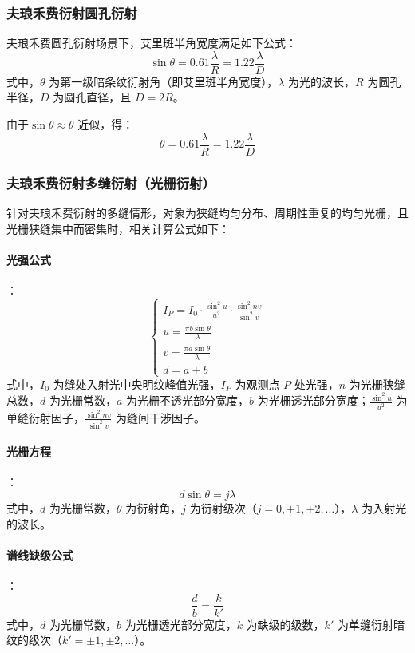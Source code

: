 \documentclass{article}
\begin{document}
	
	\subsubsection{夫琅禾费衍射圆孔衍射}夫琅禾费圆孔衍射场景下，艾里斑半角宽度满足如下公式：
	\[
	\sin\theta = 0.61\frac{\lambda}{R} = 1.22\frac{\lambda}{D}
	\]
	式中，\(\theta\) 为第一级暗条纹衍射角（即艾里斑半角宽度），\(\lambda\) 为光的波长，\(R\) 为圆孔半径，\(D\) 为圆孔直径，且 \(D = 2R\)。
	
	由于$\sin\theta \approx \theta$ 近似，得：
	\[
	\theta = 0.61\frac{\lambda}{R} = 1.22\frac{\lambda}{D}
	\]
	
	\subsubsection{夫琅禾费衍射多缝衍射（光栅衍射）}
	
	针对夫琅禾费衍射的多缝情形，对象为狭缝均匀分布、周期性重复的均匀光栅，且光栅狭缝集中而密集时，相关计算公式如下：
	
	
	\paragraph{光强公式}：
	\[
	\begin{cases}
		I_P = I_0 \cdot \frac{\sin^2 u}{u^2} \cdot \frac{\sin^2 nv}{\sin^2 v} \\
		u = \frac{\pi b \sin\theta}{\lambda} \\
		v = \frac{\pi d \sin\theta}{\lambda} \\
		d = a + b
	\end{cases}
	\]
	式中，\(I_0\) 为缝处入射光中央明纹峰值光强，\(I_P\) 为观测点 \(P\) 处光强，\(n\) 为光栅狭缝总数，\(d\) 为光栅常数，\(a\) 为光栅不透光部分宽度，\(b\) 为光栅透光部分宽度；\(\frac{\sin^2 u}{u^2}\) 为单缝衍射因子，\(\frac{\sin^2 nv}{\sin^2 v}\) 为缝间干涉因子。
	
	\paragraph{光栅方程}：
	\[
	d\sin\theta = j\lambda
	\]
	式中，\(d\) 为光栅常数，\(\theta\) 为衍射角，\(j\) 为衍射级次（\(j = 0, \pm1, \pm2, \dots\)），\(\lambda\) 为入射光的波长。
	
	\paragraph{谱线缺级公式}：
	\[
	\frac{d}{b} = \frac{k}{k'}
	\]
	式中，\(d\) 为光栅常数，\(b\) 为光栅透光部分宽度，\(k\) 为缺级的级数，\(k'\) 为单缝衍射暗纹的级次（\(k' = \pm1, \pm2, \dots\)）。
	
\end{document}
